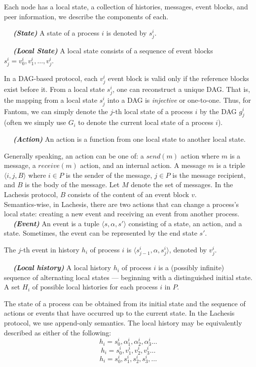 \documentclass{article}
\newcommand{\dfnn}[2]{$\quad$ \textbf{\emph{(#1)}} {#2}}
\begin{document}
Each node has a local state, a collection of histories, messages, event blocks, and peer information, we describe the components of each.

\dfnn{State}{A state of a process $i$ is denoted by $s_j^i$.}

\dfnn{Local State}{A local state consists of a sequence of event blocks $s_j^i = v_0^i, v_1^i, \dots, v_j^i$.}

In a DAG-based protocol, each $v_j^i$ event block is valid only if the reference blocks exist before it. From a local state $s_j^i$, one can reconstruct a unique DAG. That is, the mapping from a local state  $s_j^i$ into a DAG is \emph{injective} or one-to-one. Thus, for Fantom, we can simply denote the $j$-th local state of a process $i$ by the DAG $g_j^i$ (often we simply use $G_i$ to denote the current local state of a process $i$).

\dfnn{Action}{An action is a function from one local state to another local state.}

Generally speaking, an action can be one of: a $send(m)$ action where $m$ is a message, a $receive(m)$ action, and an internal action. A message $m$ is a triple $\langle i,j,B \rangle$ where $i \in P$ is the sender of the message, $j \in P$ is the message recipient, and $B$ is the body of the message. Let $M$ denote the set of messages. In the Lachesis protocol, $B$ consists of the content of an event block $v$.\\

Semantics-wise, in Lachesis, there are  two actions that can change a process's local state: creating a new event and receiving an event from another process.\\

\dfnn{Event}{An event is a tuple $\langle  s,\alpha,s' \rangle$ consisting of a state, an action, and a state. Sometimes, the event can be represented by the end state $s'$.}

The $j$-th event in history $h_i$ of process $i$ is $\langle  s_{j-1}^i,\alpha,s_j^i \rangle$, denoted by $v_j^i$.

\dfnn{Local history}{A local history $h_i$ of process $i$ is a (possibly infinite) sequence of alternating local states  --- beginning with a distinguished initial state. A set $H_i$ of possible local histories for each process $i$ in $P$.}

The state of a process can be obtained from its initial state and the sequence of actions or events that have occurred up to the current state. In the Lachesis protocol, we use append-only semantics. The local history may be equivalently described as either of the following:
$$h_i = s_0^i,\alpha_1^i,\alpha_2^i, \alpha_3^i \dots $$
$$h_i = s_0^i, v_1^i,v_2^i, v_3^i \dots $$
$$h_i = s_0^i, s_1^i, s_2^i, s_3^i, \dots$$
\end{document}
